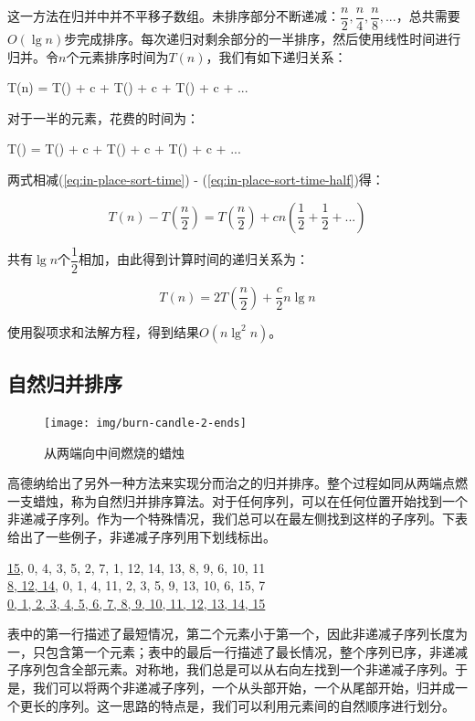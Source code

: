 \documentclass[b5paper]{ctexart}
\begin{document}
这一方法在归并中并不平移子数组。未排序部分不断递减：$\dfrac{n}{2}, \dfrac{n}{4}, \dfrac{n}{8}, ...$，总共需要$O(\lg n)$步完成排序。每次递归对剩余部分的一半排序，然后使用线性时间进行归并。令$n$个元素排序时间为$T(n)$，我们有如下递归关系：

\be
T(n) = T() + c  + T() + c  + T() + c  + ...
\label{eq:in-place-sort-time}
\ee

对于一半的元素，花费的时间为：

\be
T() = T() + c  + T() + c  + T() + c  + ...
\label{eq:in-place-sort-time-half}
\ee

两式相减(\cref{eq:in-place-sort-time}) - (\cref{eq:in-place-sort-time-half})得：

\[
T(n) - T(\frac{n}{2}) = T(\frac{n}{2}) + c n (\frac{1}{2} + \frac{1}{2} + ... )
\]

共有$\lg n$个$\dfrac{1}{2}$相加，由此得到计算时间的递归关系为：

\[
T(n) = 2 T(\frac{n}{2}) + \frac{c}{2} n \lg n
\]

使用裂项求和法解方程，得到结果$O(n \lg^2 n)$。

\subsection{自然归并排序}

\begin{figure}[htbp]
 \centering
 \texttt{[image: img/burn-candle-2-ends]}
 \caption{从两端向中间燃烧的蜡烛}
 \label{fig:burn-candle}
\end{figure}

高德纳给出了另外一种方法来实现分而治之的归并排序。整个过程如同从两端点燃一支蜡烛\cite{TAOCP}，称为自然归并排序算法。对于任何序列，可以在任何位置开始找到一个非递减子序列。作为一个特殊情况，我们总可以在最左侧找到这样的子序列。下表给出了一些例子，非递减子序列用下划线标出。

\underline{15}, 0, 4, 3, 5, 2, 7, 1, 12, 14, 13, 8, 9, 6, 10, 11 \\
\underline{8, 12, 14}, 0, 1, 4, 11, 2, 3, 5, 9, 13, 10, 6, 15, 7 \\
\underline{0, 1, 2, 3, 4, 5, 6, 7, 8, 9, 10, 11, 12, 13, 14, 15} \\
\etab

表中的第一行描述了最短情况，第二个元素小于第一个，因此非递减子序列长度为一，只包含第一个元素；表中的最后一行描述了最长情况，整个序列已序，非递减子序列包含全部元素。对称地，我们总是可以从右向左找到一个非递减子序列。于是，我们可以将两个非递减子序列，一个从头部开始，一个从尾部开始，归并成一个更长的序列。这一思路的特点是，我们可以利用元素间的自然顺序进行划分。
\end{document}
